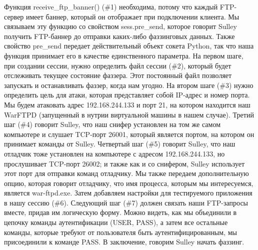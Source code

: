 \documentclass[12pt]{book}
\begin{document}



Функция receive\_ftp\_banner() (\#1) необходима, потому что каждый FTP-сервер имеет баннер, который он отображает при подключении клиента. Мы связываем эту функцию со свойством sess.pre\_send, которое говорит Sulley получить FTP-баннер до отправки каких-либо фаззинговых данных. Также свойство pre\_send передает действительный объект сокета Python, так что наша функция принимает его в качестве единственного параметра. На первом шаге, при создании сессии, нужно определить файл сессии (\#2), который будет отслеживать текущее состояние фаззера. Этот постоянный файл позволяет запускать и останавливать фаззер, когда нам угодно. На втором шаге (\#3) нужно определить цель для атаки, которая представляет собой IP-адрес и номер порта. Мы будем атаковать адрес 192.168.244.133 и порт 21, на котором находится наш WarFTPD (запущенный в нутрии виртуальной машины в нашем случае). Третий шаг (\#4) говорит Sulley, что наш снифер установлен на том же самом компьютере и слушает TCP-порт 26001, который является портом, на котором он принимает команды от Sulley. Четвертый шаг (\#5) говорит Sulley, что наш отладчик тоже установлен на компьютере с адресом 192.168.244.133, но прослушивает TCP-порт 26002; и также как и со снифером, Sulley использует этот порт для отправки команд отладчику. Мы также передаем дополнительную опцию, которая говорит отладчику, что имя процесса, которым мы интересуемся, является war-ftpd.exe. Затем добавляем настройки для тестируемого приложения в нашу сессию (\#6). Следующий шаг (\#7) должен связать наши FTP-запросы вместе, придав им логическую форму. Можно видеть, как мы объединили в цепочку команды аутентификации (USER, PASS), а затем все остальные команды, которые требуют от пользователя быть аутентифицированным, мы присоединили к команде PASS. В заключение, говорим Sulley начать фаззинг.
\end{document}
